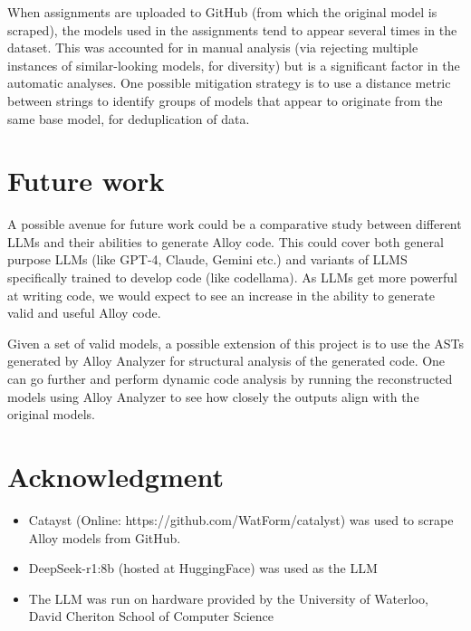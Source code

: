 \documentclass[conference]{IEEEtran}
\begin{document}
When assignments are uploaded to GitHub (from which the original model is scraped), the models used in the assignments tend to appear several times in the dataset. This was accounted for in manual analysis (via rejecting multiple instances of similar-looking models, for diversity) but is a significant factor in the automatic analyses. One possible mitigation strategy is to use a distance metric between strings to identify groups of models that appear to originate from the same base model, for deduplication of data.

\section{Future work}

A possible avenue for future work could be a comparative study between different LLMs and their abilities to generate Alloy code. This could cover both general purpose LLMs (like GPT-4, Claude, Gemini etc.) and variants of LLMS specifically trained to develop code (like codellama). As LLMs get more powerful at writing code, we would expect to see an increase in the ability to generate valid and useful Alloy code.

Given a set of valid models, a possible extension of this project is to use the ASTs generated by Alloy Analyzer for structural analysis of the generated code. One can go further and perform dynamic code analysis by running the reconstructed models using Alloy Analyzer to see how closely the outputs align with the original models.


\section{Acknowledgment}

\begin{itemize}
    \item Catayst (Online: https://github.com/WatForm/catalyst) was used to scrape Alloy models from GitHub. 
    \item DeepSeek-r1:8b (hosted at HuggingFace) was used as the LLM
    \item The LLM was run on hardware provided by the University of Waterloo, David Cheriton School of Computer Science
\end{itemize}
\end{document}
